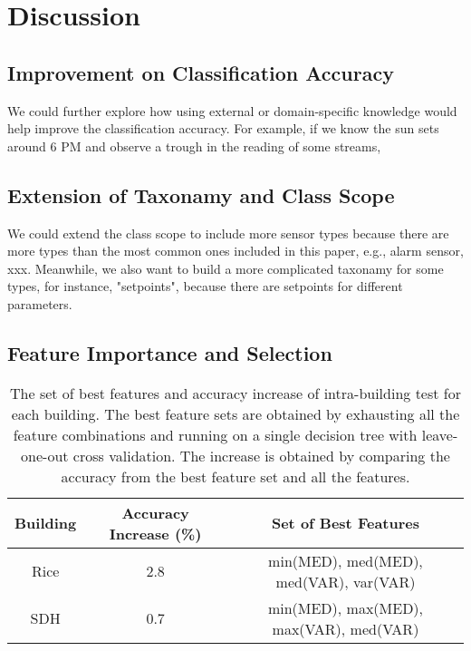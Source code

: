 \section{Discussion}
\subsection{Improvement on Classification Accuracy}
We could further explore how using external or domain-specific knowledge would help improve the classification accuracy. For example, if we know the sun sets around 6 PM and observe a trough in the reading of some streams, 

\subsection{Extension of Taxonamy and Class Scope}
We could extend the class scope to include more sensor types because there are more types than the most common ones included in this paper, e.g., alarm sensor, xxx. Meanwhile, we also want to build a more complicated taxonamy for some types, for instance, "setpoints", because there are setpoints for different parameters.  

\subsection{Feature Importance and Selection}
\begin{table*}
    \centering %
    \begin{tabular}{c c c}%
        \hline %
        Building & Accuracy Increase (\%) & Set of Best Features \\ %
        \hline\hline %
        Rice & 2.8 & min(MED), med(MED), med(VAR), var(VAR) \\ \hline
        SDH & 0.7 & min(MED), max(MED), max(VAR), med(VAR) \\\hline
    \end{tabular}
    \caption{The set of best features and accuracy increase of intra-building test for each building. The best feature sets are obtained by exhausting all the feature combinations and running on a single decision tree with leave-one-out cross validation. The increase is obtained by comparing the accuracy from the best feature set and all the features.}
    \label{table:feature} %
\end{table*}

